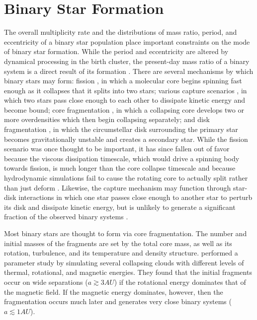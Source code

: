 \documentclass{utthesis}
\begin{document}
\section{Binary Star Formation}

The overall multiplicity rate and the distributions of mass ratio, period, and eccentricity of a binary star population place important constraints on the mode of binary star formation. While the period and eccentricity are altered by dynamical processing in the birth cluster, the present-day mass ratio of a binary system is a direct result of its formation \citep{Parker2013}. There are several mechanisms by which binary stars may form: fission \citep{Lyttleton1953,  Lebovitz1974, Lebovitz1984}, in which a molecular core begins spinning fast enough as it collapses that it splits into two stars; various capture scenarios \citep[e.g.][]{Fabian1975}, in which two stars pass close enough to each other to dissipate kinetic energy and become bound; core fragmentation \citep[see e.g.][]{Boss1979, Boss1986, Bate1995}, in which a collapsing core develops two or more overdensities which then begin collapsing separately; and disk fragmentation \citep[see e.g.][]{Kratter2006, Stamatellos2011}, in which the circumstellar disk surrounding the primary star becomes gravitationally unstable and creates a secondary star. While the fission scenario was once thought to be important, it has since fallen out of favor because the viscous dissipation timescale, which would drive a spinning body towards fission, is much longer than the core collapse timescale \citep{Tohline2002} and because hydrodynamic simulations fail to cause the rotating core to actually split rather than just deform \citep{Tohline2001}. Likewise, the capture mechanism may function through star-disk interactions in which one star passes close enough to another star to perturb its disk and dissipate kinetic energy, but is unlikely to generate a significant fraction of the observed binary systems \citep{Tohline2002}.

Most binary stars are thought to form via core fragmentation. The number and initial masses of the fragments are set by the total core mass, as well as its rotation, turbulence, and its temperature and density structure. \citet{Machida2008} performed a parameter study by simulating several collapsing clouds with different levels of thermal, rotational, and magnetic energies. They found that the initial fragments occur on wide separations ($a \gtrsim 3 AU$) if the rotational energy dominates that of the magnetic field. If the magnetic energy dominates, however, then the fragmentation occurs much later and generates very close binary systems ($a \lesssim 1 AU$). 
\end{document}
